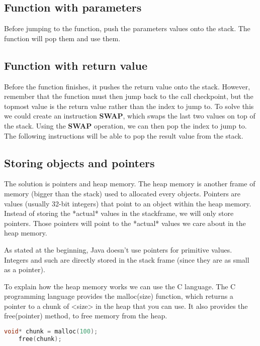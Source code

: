 \documentclass[../documentation.tex]{subfiles}
\begin{document}
\subsection{Function with parameters}

Before jumping to the function, push the parameters values onto the stack.
The function will pop them and use them.

\subsection{Function with return value}

Before the function finishes, it pushes the return value onto the stack.
However, remember that the function must then jump back to the call checkpoint,
but the topmost value is the return value rather than the index to jump to.
To solve this we could create an instruction \textbf{SWAP}, which swaps the last two values on top of the stack.
Using the \textbf{SWAP} operation, we can then pop the index to jump to. The following instructions will be able to pop
the result value from the stack.

\subsection{Storing objects and pointers}

The solution is pointers and heap memory.
The heap memory is another frame of memory (bigger than the stack) used to allocated every objects.
Pointers are values (usually 32-bit integers) that point to an object within the heap memory.
Instead of storing the *actual* values in the stackframe, we will only store pointers.
Those pointers will point to the *actual* values we care about in the heap memory.

As stated at the beginning, Java doesn't use pointers for primitive values. Integers and such
are directly stored in the stack frame (since they are as small as a pointer).

To explain how the heap memory works we can use the C language.
The C programming language provides the malloc(size) function, which returns a pointer to a chunk of <size> in the heap that you can use.
It also provides the free(pointer) method, to free memory from the heap.

\begin{lstlisting}[language=C]
    void* chunk = malloc(100);
    free(chunk);
\end{lstlisting}
\end{document}
